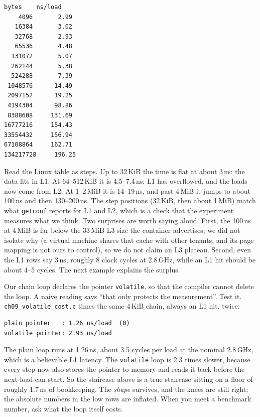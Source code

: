 \begin{lstlisting}[language={},caption={Linux x86\_64 container, one
full run of \texttt{./ch09\_mem\_mountain} (20 million dependent loads
per size). Captured in \texttt{code/ch09\_mountain\_linux.txt}.}]
   bytes    ns/load
    4096       2.99
   16384       3.02
   32768       2.93
   65536       4.48
  131072       5.07
  262144       5.38
  524288       7.39
 1048576      14.49
 2097152      19.25
 4194304      98.86
 8388608     131.69
16777216     154.43
33554432     156.94
67108864     162.71
134217728     196.25
\end{lstlisting}

\begin{example}
Read the Linux table as steps. Up to 32\,KiB the time is flat at about
3\,ns: the data fits in L1. At 64--512\,KiB it is 4.5--7.4\,ns: L1 has
overflowed, and the loads now come from L2. At 1--2\,MiB it is
14--19\,ns, and past 4\,MiB it jumps to about 100\,ns and then 130--200\,ns.
The step positions (32\,KiB, then about 1\,MiB) match what \texttt{getconf}
reports for L1 and L2, which is a check that the experiment measures
what we think. Two surprises are worth saying aloud. First, the
100\,ns at 4\,MiB is far below the 33\,MiB L3 size the container
advertises; we did not isolate why (a virtual machine shares that
cache with other tenants, and its page mapping is not ours to control),
so we do not claim an L3 plateau. Second, even the L1 rows say 3\,ns,
roughly 8 clock cycles at 2.8\,GHz, while an L1 hit should be about 4--5
cycles. The next example explains the surplus.
\end{example}

\begin{example}
Our chain loop declares the pointer \texttt{volatile}, so that the
compiler cannot delete the loop. A naive reading says ``that only
protects the measurement''. Test it. \texttt{ch09\_volatile\_cost.c}
times the same 4\,KiB chain, always an L1 hit, twice:

\begin{lstlisting}[language={},caption={Linux x86\_64 container,
\texttt{./ch09\_volatile\_cost}: the same L1-resident chain with a plain
and a \texttt{volatile} pointer.}]
plain pointer   : 1.26 ns/load  (0)
volatile pointer: 2.93 ns/load
\end{lstlisting}

The plain loop runs at 1.26\,ns, about 3.5 cycles per load at the nominal 2.8\,GHz, which is a
believable L1 latency. The \texttt{volatile} loop is 2.3 times slower,
because every step now also stores the pointer to memory and reads it
back before the next load can start. So the staircase above is a true
staircase sitting on a floor of roughly 1.7\,ns of bookkeeping. The
\emph{shape} survives, and the knees are still right; the absolute
numbers in the low rows are inflated. When you meet a benchmark number,
ask what the loop itself costs.
\end{example}

